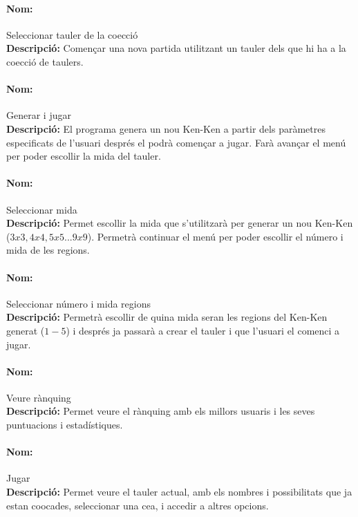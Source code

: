 \documentclass[a4paper,12pt]{article}
\begin{document}
\paragraph{Nom:} Seleccionar tauler de la co\lgem ecció \\
\textbf{Descripció:}
Començar una nova partida utilitzant un tauler dels que hi ha a la co\lgem ecció de taulers.

\paragraph{Nom:} Generar i jugar \\
\textbf{Descripció:}
El programa genera un nou Ken-Ken a partir dels paràmetres especificats de l'usuari després el podrà començar a jugar. Farà avançar el menú per poder escollir la mida del tauler.

\paragraph{Nom:} Seleccionar mida \\
\textbf{Descripció:}
Permet escollir la mida que s'utilitzarà per generar un nou Ken-Ken ($3x3, 4x4, 5x5... 9x9$).
Permetrà continuar el menú per poder escollir el número i mida de les regions.

\paragraph{Nom:} Seleccionar número i mida regions \\
\textbf{Descripció:} 
Permetrà escollir de quina mida seran les regions del Ken-Ken generat ($1 - 5$) i després ja passarà a crear el tauler i que l'usuari el comenci a jugar.

\paragraph{Nom:} Veure rànquing\\
\textbf{Descripció:} 
Permet veure el rànquing amb els millors usuaris i les seves puntuacions i estadístiques.

\paragraph{Nom:} Jugar\\
\textbf{Descripció:} 
Permet veure el tauler actual, amb els nombres i possibilitats que ja estan co\lgem ocades, seleccionar una ce\lgem a, i accedir a altres opcions.
\end{document}
